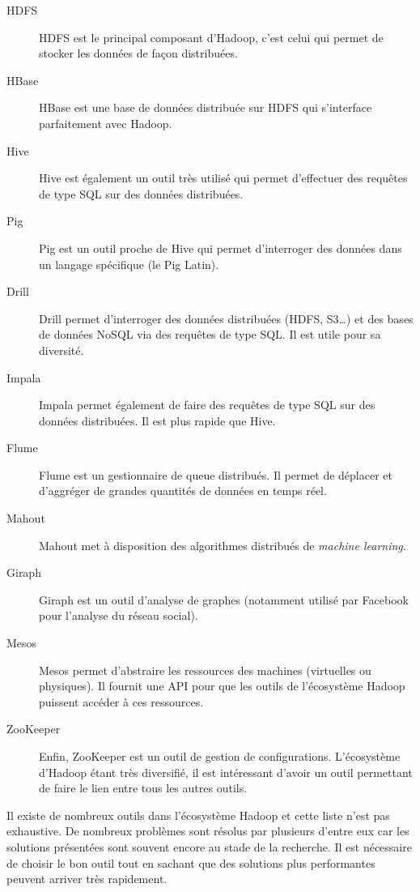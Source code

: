     \begin{description}
      \item[HDFS] HDFS est le principal composant d'Hadoop, c'est celui qui permet de stocker les données de façon distribuées.
      \item[HBase] HBase est une base de données distribuée sur HDFS qui s'interface parfaitement avec Hadoop.
      \item[Hive] Hive est également un outil très utilisé qui permet d'effectuer des requêtes de type SQL sur des données distribuées.
      \item[Pig] Pig est un outil proche de Hive qui permet d'interroger des données dans un langage spécifique (le Pig Latin).
      \item[Drill] Drill permet d'interroger des données distribuées (HDFS, S3…) et des bases de données NoSQL via des requêtes de type SQL. Il est utile pour sa diversité.
      \item[Impala] Impala permet également de faire des requêtes de type SQL sur des données distribuées. Il est plus rapide que Hive.
      \item[Flume] Flume est un gestionnaire de queue distribués. Il permet de déplacer et d'aggréger de grandes quantités de données en temps réel.
      \item[Mahout] Mahout met à disposition des algorithmes distribués de \textit{machine learning}.
      \item[Giraph] Giraph est un outil d'analyse de graphes (notamment utilisé par Facebook pour l'analyse du réseau social).
      \item[Mesos] Mesos permet d'abstraire les ressources des machines (virtuelles ou physiques). Il fournit une API pour que les outils de l'écosystème Hadoop puissent accéder à ces ressources.
      \item[ZooKeeper] Enfin, ZooKeeper est un outil de gestion de configurations. L'écosystème d'Hadoop étant très diversifié, il est intéressant d'avoir un outil permettant de faire le lien entre tous les autres outils.
    \end{description} \bigskip
    Il existe de nombreux outils dans l'écosystème Hadoop et cette liste n'est pas exhaustive. De nombreux problèmes sont résolus par plusieurs d'entre eux car les solutions présentées sont souvent encore au stade de la recherche. Il est nécessaire de choisir le bon outil tout en sachant que des solutions plus performantes peuvent arriver très rapidement. \\

